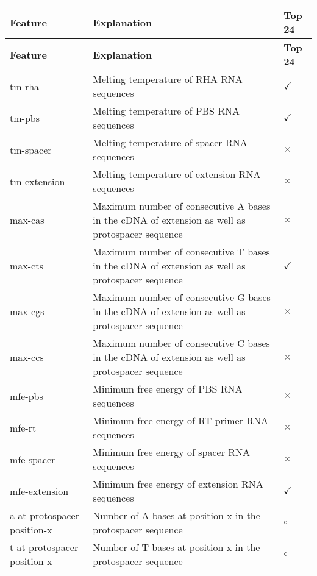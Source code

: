 \begin{longtable}{|p{}|p{}|p{}|}
    \hline
    \textbf{Feature} & \textbf{Explanation} & \textbf{Top 24} \\ 
    \hline
    \endfirsthead

    \hline
    \textbf{Feature} & \textbf{Explanation} & \textbf{Top 24} \\ 
    \hline
    \endhead

    \hline
    \endfoot

    \hline
    \endlastfoot

    tm-rha & Melting temperature of RHA RNA sequences & $\checkmark$ \\
    \hline
    tm-pbs & Melting temperature of PBS RNA sequences & $\checkmark$ \\
    \hline
    tm-spacer & Melting temperature of spacer RNA sequences & $\times$ \\
    \hline
    tm-extension & Melting temperature of extension RNA sequences & $\times$ \\
    \hline
    max-cas & Maximum number of consecutive A bases in the cDNA of extension as well as protospacer sequence & $\times$ \\
    \hline
    max-cts & Maximum number of consecutive T bases in the cDNA of extension as well as protospacer sequence & $\checkmark$ \\
    \hline
    max-cgs & Maximum number of consecutive G bases in the cDNA of extension as well as protospacer sequence & $\times$ \\
    \hline
    max-ccs & Maximum number of consecutive C bases in the cDNA of extension as well as protospacer sequence & $\times$ \\
    \hline
    mfe-pbs & Minimum free energy of PBS RNA sequences & $\times$ \\
    \hline
    mfe-rt & Minimum free energy of RT primer RNA sequences & $\times$ \\
    \hline
    mfe-spacer & Minimum free energy of spacer RNA sequences & $\times$ \\
    \hline
    mfe-extension & Minimum free energy of extension RNA sequences & $\checkmark$ \\
    \hline
    a-at-protospacer-position-x & Number of A bases at position x in the protospacer sequence & $\circ$ \\
    \hline
    t-at-protospacer-position-x & Number of T bases at position x in the protospacer sequence & $\circ$ \\

\end{longtable}

